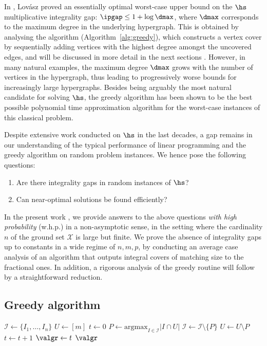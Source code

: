 In \cite{lovasz1975ratio}, Lovász proved an essentially optimal worst-case upper bound on the $\hs$ multiplicative integrality gap: $\ipgap \leq 1+\log \dmax$, where $\dmax$ corresponds to the maximum degree in the underlying hypergraph. 
This is obtained by analysing the \greedy algorithm (Algorithm~\ref{alg:greedy}), 
which constructs a vertex cover by sequentially adding vertices with the highest degree amongst the uncovered edges, 
and will be discussed in more detail in the next sections . 
However, in many natural examples, the maximum degree $\dmax$ grows with the number of vertices in the hypergraph, thus leading to progressively worse bounds for increasingly large hypergraphs. Besides being arguably the most natural candidate for solving $\hs$, the greedy algorithm has been shown to be the best possible polynomial time approximation algorithm \cite{slavik1996tight} for the worst-case instances of this classical problem. 

Despite extensive work conducted on $\hs$ in the last decades, a gap remains in our understanding of the typical performance of linear programming and the greedy algorithm on random problem instances. 
We hence pose the following questions: 

\begin{enumerate}
    \item Are there integrality gaps in random instances of $\hs$? 
    \item Can near-optimal solutions be found efficiently? 
\end{enumerate}

\noindent
In the present work , we provide answers to the above questions 
\emph{with high probability} (w.h.p.) in a non-asymptotic sense, 
in the setting where the cardinality $n$ of the ground set $\mathcal{X}$ 
is large but finite. 
We prove the absence of integrality gaps up to constants in a wide regime of $n,m,p$, by conducting an average case analysis of an algorithm that outputs integral covers of matching size to the fractional ones. 
In addition, a rigorous analysis of the greedy routine will follow by a straightforward reduction. 

\subsection{Greedy algorithm}

\begin{algorithm}[!t]
    \caption{\greedy}\label{alg:greedy}
    \begin{algorithmic}[1]
    \State \(\mathcal{I} \gets \{I_1, \ldots, I_n\} \) 
    \State \(U \gets [m]\)
    \State \(t \gets 0\)
        \State \(P \gets \mathrm{argmax}_{I \in \mathcal{I}}\bigl|I \cap U\bigr| \) 
        \State \(\mathcal{I} \gets \mathcal{I} \setminus \{P\}\)
        \State \(U \gets U \setminus P\)
        \State \(t \gets t + 1\)
    \EndWhile
    \State \(\valgr \gets t\)
    \State \Return \(\valgr\)
    \end{algorithmic}
    \end{algorithm}

